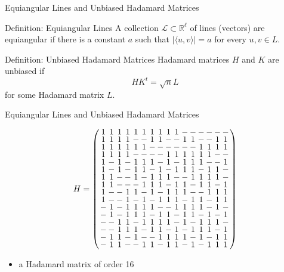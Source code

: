 \documentclass{beamer}
\begin{document}

\begin{frame}{Equiangular Lines and Unbiased Hadamard Matrices}

  \begin{block}{Definition: Equiangular Lines}
    A collection $\mathcal{L} \subset \mathbb{R}^\ell$ of lines (vectors) are
    equiangular if there is a constant $a$ such that $|\langle u,v \rangle| = a$ for
    every $u,v \in L$.
  \end{block}

  \begin{block}{Definition: Unbiased Hadamard Matrices}
    Hadamard matrices $H$ and $K$ are unbiased if
    \[
      HK^t = \sqrt{n}L
    \]
    for some Hadamard matrix $L$.
  \end{block}
  
\end{frame}

\begin{frame}{Equiangular Lines and Unbiased Hadamard Matrices}

  \[
    H=
    \arraycolsep=1.0pt\def\arraystretch{0.75}
    \left(\begin{array}{cccccccccccccccc}
            1&1&1&1&1&1&1&1&1&1&-&-&-&-&-&-\\
            1&1&1&1&-&-&1&1&-&-&1&1&-&-&1&1\\
            1&1&1&1&1&1&-&-&-&-&-&-&1&1&1&1\\
            1&1&1&1&-&-&-&-&1&1&1&1&1&1&-&-\\
            1&-&1&-&1&1&1&-&1&-&1&1&1&-&-&1\\
            1&-&1&-&1&1&-&1&-&1&1&1&-&1&1&-\\
            1&1&-&-&1&-&1&1&1&-&-&1&1&1&1&-\\
            1&1&-&-&-&1&1&1&-&1&1&-&1&1&-&1\\
            1&-&-&1&1&-&1&-&1&1&1&-&-&1&1&1\\
            1&-&-&1&-&1&-&1&1&1&-&1&1&-&1&1\\
            -&1&-&1&1&1&1&-&-&1&1&1&1&-&1&-\\
            -&1&-&1&1&1&-&1&1&-&1&1&-&1&-&1\\
            -&-&1&1&-&1&1&1&1&-&1&-&1&1&1&-\\
            -&-&1&1&1&-&1&1&-&1&-&1&1&1&-&1\\
            -&1&1&-&1&-&-&1&1&1&1&-&1&-&1&1\\
            -&1&1&-&-&1&1&-&1&1&-&1&-&1&1&1\\
          \end{array}\right)
  \]

  \begin{itemize}
  \item a Hadamard matrix of order 16
  \end{itemize}

\end{frame}
\end{document}
